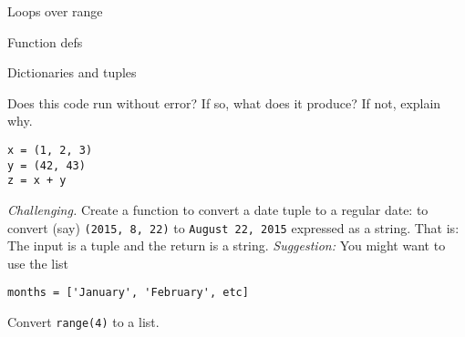 \documentclass[11pt]{exam}
\begin{document}
\begin{questions}
\item Loops over range


\item Function defs


\item Dictionaries and tuples

\item
Does this code run without error?  If so, what does it produce?  If not, explain why.
\begin{verbatim}
x = (1, 2, 3)
y = (42, 43)
z = x + y
\end{verbatim}



\item {\it Challenging.\/}
Create a function to convert a date tuple to a regular date:
to convert (say) \texttt{(2015, 8, 22)} to \texttt{August 22, 2015} expressed as a string.
That is:  The input is a tuple and the return is a string.
{\it Suggestion:\/} You might want to use the list
\begin{verbatim}
months = ['January', 'February', etc]
\end{verbatim}

\item Convert \texttt{range(4)} to a list.


\item

\end{questions}
\end{document}
